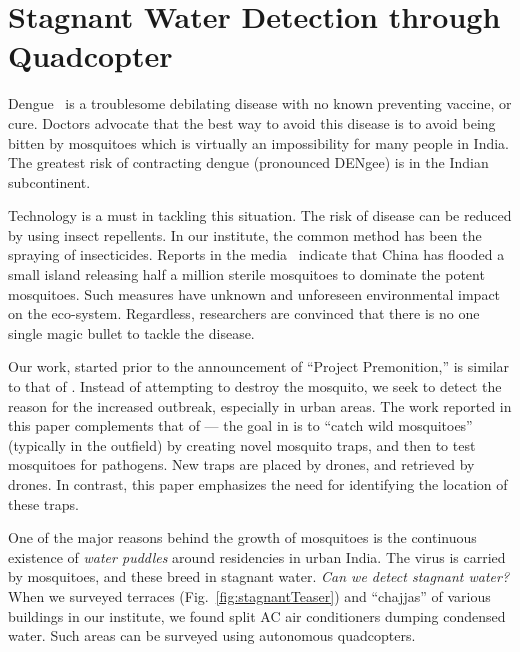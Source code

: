 \chapter[Stagnant Water Detection]{Stagnant Water Detection through Quadcopter}
Dengue~\cite{WHO15Dengue} is a troublesome debilating disease with no
known preventing vaccine, or cure. Doctors advocate that the best way
to avoid this disease is to avoid being bitten by mosquitoes which is
virtually an impossibility for many people in India.  The greatest
risk of contracting dengue (pronounced DENgee) is in the Indian
subcontinent.  

Technology is a must in tackling this situation.  The risk of disease
can be reduced by using insect repellents. In our institute, the
common method has been the spraying of insecticides.  Reports in the
media~\cite{china} indicate that China has flooded a small island
releasing half a million sterile mosquitoes to dominate the potent
mosquitoes. Such measures have unknown and unforeseen environmental
impact on the eco-system. Regardless, researchers are convinced that
there is no one single magic bullet to tackle the disease. 

Our work, started prior to the announcement of ``Project
Premonition,'' is similar to that of \cite{Microsoft15}.  Instead of
attempting to destroy the mosquito, we seek to detect the reason for
the increased outbreak, especially in urban areas.  The work reported
in this paper complements that of \cite{Microsoft15} --- the goal in \cite{Microsoft15}
is to ``catch wild mosquitoes'' (typically in the outfield) by
creating novel mosquito traps, and then to test mosquitoes for
pathogens. New traps are placed by drones, and retrieved by drones.
In contrast, this paper emphasizes the need for identifying the
location of these traps.  

One of the major reasons behind the growth of mosquitoes is the
continuous existence of \emph{water puddles} around residencies in
urban India.  The virus is carried by mosquitoes, and these breed in
stagnant water. \emph{Can we detect stagnant water?}  When we surveyed
terraces (Fig.~\ref{fig:stagnantTeaser}) and ``chajjas'' of various buildings in
our institute, we found split AC air conditioners dumping condensed
water. Such areas can be surveyed using autonomous quadcopters.

